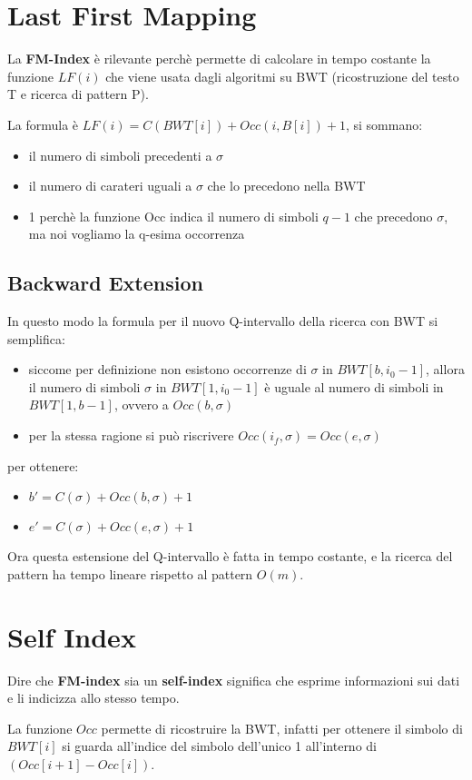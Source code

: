 \section{Last First Mapping}

La \textbf{FM-Index} \`e rilevante perch\`e permette di calcolare in tempo costante la funzione $LF(i)$ che viene usata dagli algoritmi su BWT (ricostruzione del testo T e ricerca di pattern P).

La formula \`e $LF(i) = C(BWT[i]) + Occ(i, B[i]) + 1$, si sommano:

\begin{itemize}
    \item il numero di simboli precedenti a $\sigma$
    \item il numero di carateri uguali a $\sigma$ che lo precedono nella BWT
    \item 1 perch\`e la funzione Occ indica il numero di simboli $q-1$ che precedono $\sigma$, ma noi vogliamo la q-esima occorrenza 
\end{itemize}

\subsection{Backward Extension}

In questo modo la formula per il nuovo Q-intervallo della ricerca con BWT si semplifica:

\begin{itemize}
    \item siccome per definizione non esistono occorrenze di $\sigma$ in $BWT[b, i_0-1]$, allora il numero di simboli $\sigma$ in $BWT[1,i_0-1]$ \`e uguale al numero di simboli in $BWT[1,b-1]$, ovvero a $Occ(b, \sigma)$
    \item per la stessa ragione si pu\`o riscrivere $Occ(i_f, \sigma) = Occ(e, \sigma)$
\end{itemize}

per ottenere:

\begin{itemize}
    \item $b' = C(\sigma) + Occ(b, \sigma) + 1$
    \item $e' = C(\sigma) + Occ(e, \sigma) + 1$
\end{itemize}

Ora questa estensione del Q-intervallo \`e fatta in tempo costante, e la ricerca del pattern ha tempo lineare rispetto al pattern $O(m)$.

\section{Self Index}

Dire che \textbf{FM-index} sia un \textbf{self-index} significa che esprime informazioni sui dati e li indicizza allo stesso tempo.

La funzione $Occ$ permette di ricostruire la BWT, infatti per ottenere il simbolo di $BWT[i]$ si guarda all'indice del simbolo dell'unico 1 all'interno di $(Occ[i+1] - Occ[i])$.
